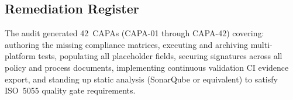 \subsection{Remediation Register}

The audit generated 42~CAPAs (CAPA-01 through CAPA-42) covering: authoring the missing
compliance matrices, executing and archiving multi-platform tests, populating all
placeholder fields, securing signatures across all policy and process documents,
implementing continuous validation CI evidence export, and standing up static analysis
(SonarQube or equivalent) to satisfy ISO~5055 quality gate requirements.

